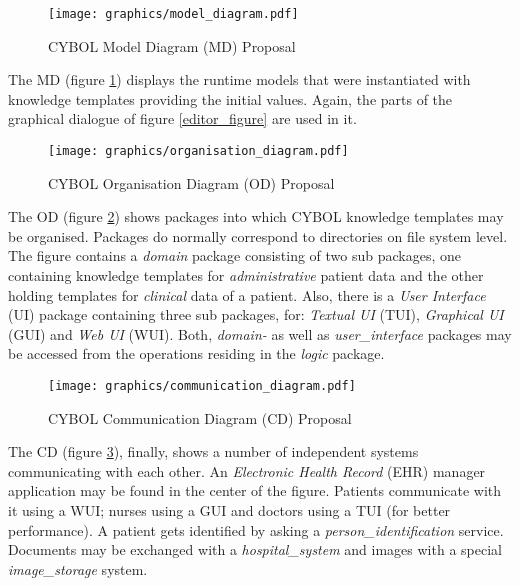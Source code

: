 \begin{figure}[ht]
    \begin{center}
        \texttt{[image: graphics/model\_diagram.pdf]}
        \caption{CYBOL Model Diagram (MD) Proposal}
        \label{md_figure}
    \end{center}
\end{figure}

The MD (figure \ref{md_figure}) displays the runtime models that were
instantiated with knowledge templates providing the initial values. Again, the
parts of the graphical dialogue of figure \ref{editor_figure} are used in it.

\begin{figure}[ht]
    \begin{center}
        \texttt{[image: graphics/organisation\_diagram.pdf]}
        \caption{CYBOL Organisation Diagram (OD) Proposal}
        \label{od_figure}
    \end{center}
\end{figure}

The OD (figure \ref{od_figure}) shows packages into which CYBOL knowledge
templates may be organised. Packages do normally correspond to directories on
file system level. The figure contains a \emph{domain} package consisting of
two sub packages, one containing knowledge templates for \emph{administrative}
patient data and the other holding templates for \emph{clinical} data of a
patient. Also, there is a \emph{User Interface} (UI) package containing three
sub packages, for: \emph{Textual UI} (TUI), \emph{Graphical UI} (GUI) and
\emph{Web UI} (WUI). Both, \emph{domain-} as well as \emph{user\_interface}
packages may be accessed from the operations residing in the \emph{logic}
package.

\begin{figure}[ht]
    \begin{center}
        \texttt{[image: graphics/communication\_diagram.pdf]}
        \caption{CYBOL Communication Diagram (CD) Proposal}
        \label{cd_figure}
    \end{center}
\end{figure}

The CD (figure \ref{cd_figure}), finally, shows a number of independent systems
communicating with each other. An \emph{Electronic Health Record} (EHR) manager
application may be found in the center of the figure. Patients communicate with
it using a WUI; nurses using a GUI and doctors using a TUI (for better
performance). A patient gets identified by asking a \emph{person\_identification}
service. Documents may be exchanged with a \emph{hospital\_system} and images
with a special \emph{image\_storage} system.


